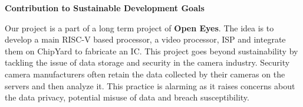 \documentclass[a4paper, 11pt, oneside]{uet_thesis}  %
\begin{document}


\clearpage  %


\pagestyle{empty}  %

\clearpage 	%

\pagestyle{plain}  %

\vspace{0.5in}
\begin{center}
	\huge{\bf Contribution to Sustainable Development Goals} 
	\par
\end{center}

\vspace{0.5in}
Our project is a part of a long term project of \textbf{Open Eyes}. The idea is to develop a main RISC-V based processor, a video processor, ISP and integrate them on ChipYard to fabricate an IC. This project goes beyond sustainability by tackling the issue of data storage and security in the camera industry. Security camera manufacturers often retain the data collected by their cameras on the servers and then analyze it. This practice is alarming as it raises concerns about the data privacy, potential misuse of data and breach susceptibility.
\end{document}
